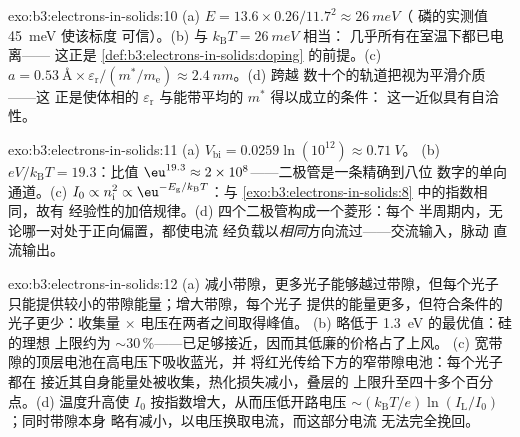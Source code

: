 \begin{solution}{exo:b3:electrons-in-solids:10}
(a) $E = 13.6\times0.26/11.7^2 \approx \qty{26}{meV}$（
磷的实测值 \qty{45}{meV} 使该标度
可信）。(b) 与 $k_{\text{B}}T = \qty{26}{meV}$ 相当：
几乎所有在室温下都已电离——
这正是 \cref{def:b3:electrons-in-solids:doping} 的前提。(c) $a =
\qty{0.53}{\angstrom}\times\varepsilon_{\text{r}}/(m^*/
m_{\text{e}}) \approx \qty{2.4}{nm}$。(d) 跨越
数十个的轨道把视为平滑介质——这
正是使体相的
$\varepsilon_{\text{r}}$ 与能带平均的 $m^*$ 得以成立的条件：
这一近似具有自洽性。
\end{solution}

\begin{solution}{exo:b3:electrons-in-solids:11}
(a) $V_{\text{bi}} = 0.0259\ln(10^{12}) \approx \qty{0.71}{V}$。
(b) $eV/k_{\text{B}}T = 19.3$：比值 $\eu^{19.3} \approx
2\times10^{8}$——二极管是一条精确到八位
数字的单向通道。(c) $I_0 \propto n_{\text{i}}^2 \propto
\eu^{-E_{\text{g}}/k_{\text{B}}T}$：与
\cref{exo:b3:electrons-in-solids:8} 中的指数相同，故有
经验性的加倍规律。(d) 四个二极管构成一个菱形：每个
半周期内，无论哪一对处于正向偏置，都使电流
经负载以\emph{相同}方向流过——交流输入，脉动
直流输出。
\end{solution}

\begin{solution}{exo:b3:electrons-in-solids:12}
(a) 减小带隙，更多光子能够越过带隙，但每个光子
只能提供较小的带隙能量；增大带隙，每个光子
提供的能量更多，但符合条件的光子更少：收集量 $\times$ 电压在两者之间取得峰值。
(b) 略低于 \qty{1.3}{eV} 的最优值：硅的理想
上限约为 $\sim30\,\%$——已足够接近，因而其低廉的价格占了上风。
(c) 宽带隙的顶层电池在高电压下吸收蓝光，并
将红光传给下方的窄带隙电池：每个光子都在
接近其自身能量处被收集，热化损失减小，叠层的
上限升至四十多个百分点。(d) 温度升高使 $I_0$
按指数增大，从而压低开路电压
$\sim(k_{\text{B}}T/e)\ln(I_{\text{L}}/I_0)$；同时带隙本身
略有减小，以电压换取电流，而这部分电流
无法完全挽回。
\end{solution}

